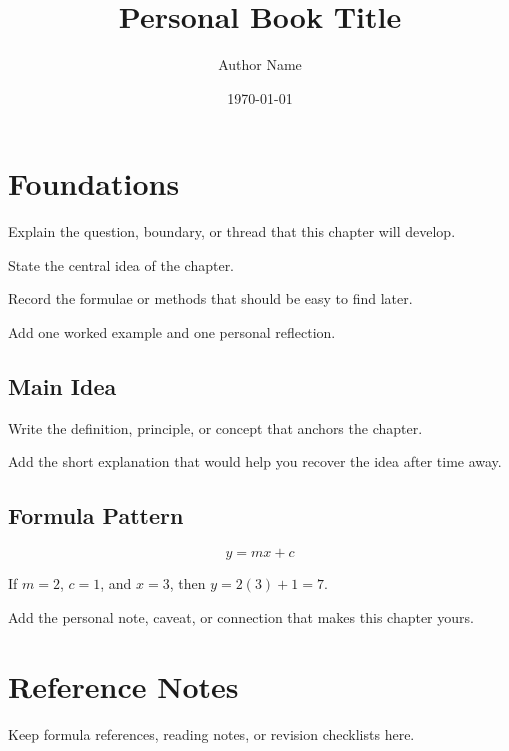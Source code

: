 \documentclass{otbook}
\title{Personal Book Title}
\author{Author Name}
\date{\today}
\begin{document}
\frontmatter
\hypersetup{pageanchor=false}
\makeotbooktitle%
\hypersetup{pageanchor=true}
\tableofcontents

\mainmatter%

\chapter{Foundations}


\begin{chapteroverview}
  Explain the question, boundary, or thread that this chapter will develop.
\end{chapteroverview}

\begin{chaptergoals}
  \item State the central idea of the chapter.
  \item Record the formulae or methods that should be easy to find later.
  \item Add one worked example and one personal reflection.
\end{chaptergoals}

\section{Main Idea}

\begin{definitionbox}
  Write the definition, principle, or concept that anchors the chapter.
\end{definitionbox}

\begin{intuitionbox}
  Add the short explanation that would help you recover the idea after time away.
\end{intuitionbox}

\section{Formula Pattern}

\begin{formulabox}
  \[
    y=mx+c
  \]
\end{formulabox}

\begin{examplebox}
  If \(m=2\), \(c=1\), and \(x=3\), then \(y=2(3)+1=7\).
\end{examplebox}

\begin{reflectionbox}
  Add the personal note, caveat, or connection that makes this chapter yours.
\end{reflectionbox}

\backmatter%

\chapter{Reference Notes}

\begin{summarybox}
  Keep formula references, reading notes, or revision checklists here.
\end{summarybox}
\end{document}
